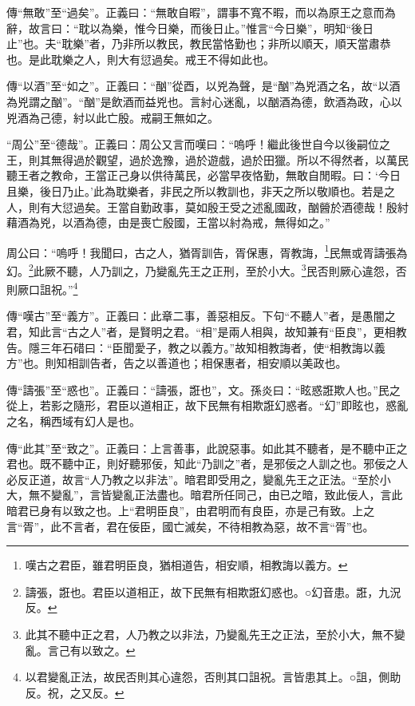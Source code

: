 {\noindent\zhuan{}\fzbyks 傳“無敢”至“過矣”。正義曰：“無敢自暇”，謂事不寬不暇，而以為原王之意而為辭，故言曰：“耽以為樂，惟今日樂，而後日止。”惟言“今日樂”，明知“後日止”也。夫“耽樂”者，乃非所以教民，教民當恪勤也；非所以順天，順天當肅恭也。是此耽樂之人，則大有愆過矣。戒王不得如此也。 \par}

{\noindent\zhuan{}\fzbyks 傳“以酒”至“如之”。正義曰：“酗”從酉，以兇為聲，是“酗”為兇酒之名，故“以酒為兇謂之酗”。“酗”是飲酒而益兇也。言紂心迷亂，以酗酒為德，飲酒為政，心以兇酒為己德，紂以此亡殷。戒嗣王無如之。 \par}

{\noindent\shu{}\fzkt “周公”至“德哉”。正義曰：周公又言而嘆曰：“嗚呼！繼此後世自今以後嗣位之王，則其無得過於觀望，過於逸豫，過於遊戲，過於田獵。所以不得然者，以萬民聽王者之教命，王當正己身以供待萬民，必當早夜恪勤，無敢自閒暇。曰：‘今日且樂，後日乃止。’此為耽樂者，非民之所以教訓也，非天之所以敬順也。若是之人，則有大愆過矣。王當自勤政事，莫如殷王受之述亂國政，酗醟於酒德哉！殷紂藉酒為兇，以酒為德，由是喪亡殷國，王當以紂為戒，無得如之。” \par}

周公曰：“嗚呼！我聞曰，古之人，猶胥訓告，胥保惠，胥教誨，\footnote{嘆古之君臣，雖君明臣良，猶相道告，相安順，相教誨以義方。}民無或胥譸張為幻。\footnote{譸張，誑也。君臣以道相正，故下民無有相欺誑幻惑也。○幻音患。誑，九況反。}此厥不聽，人乃訓之，乃變亂先王之正刑，至於小大。\footnote{此其不聽中正之君，人乃教之以非法，乃變亂先王之正法，至於小大，無不變亂。言己有以致之。}民否則厥心違怨，否則厥口詛祝。”\footnote{以君變亂正法，故民否則其心違怨，否則其口詛祝。言皆患其上。○詛，側助反。祝，之又反。}


{\noindent\zhuan{}\fzbyks 傳“嘆古”至“義方”。正義曰：此章二事，善惡相反。下句“不聽人”者，是愚闇之君，知此言“古之人”者，是賢明之君。“相”是兩人相與，故知兼有“臣良”，更相教告。隱三年石碏曰：“臣聞愛子，教之以義方。”故知相教誨者，使“相教誨以義方”也。則知相訓告者，告之以善道也；相保惠者，相安順以美政也。 \par}

{\noindent\zhuan{}\fzbyks 傳“譸張”至“惑也”。正義曰：“譸張，誑也”，文。孫炎曰：“眩惑誑欺人也。”民之從上，若影之隨形，君臣以道相正，故下民無有相欺誑幻惑者。“幻”即眩也，惑亂之名，稱西域有幻人是也。 \par}

{\noindent\zhuan{}\fzbyks 傳“此其”至“致之”。正義曰：上言善事，此說惡事。如此其不聽者，是不聽中正之君也。既不聽中正，則好聽邪佞，知此“乃訓之”者，是邪佞之人訓之也。邪佞之人必反正道，故言“人乃教之以非法”。暗君即受用之，變亂先王之正法。“至於小大，無不變亂”，言皆變亂正法盡也。暗君所任同己，由已之暗，致此佞人，言此暗君已身有以致之也。上“君明臣良”，由君明而有良臣，亦是己有致。上之言“胥”，此不言者，君在佞臣，國亡滅矣，不待相教為惡，故不言“胥”也。 \par}

